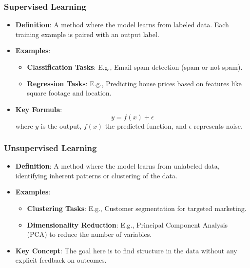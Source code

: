 \documentclass[aspectratio=169]{beamer}
\begin{document}
\begin{frame}[fragile]
    \frametitle{Supervised Learning}
    \begin{itemize}
        \item \textbf{Definition}: A method where the model learns from labeled data. Each training example is paired with an output label.
        \item \textbf{Examples}:
        \begin{itemize}
            \item \textbf{Classification Tasks}: E.g., Email spam detection (spam or not spam).
            \item \textbf{Regression Tasks}: E.g., Predicting house prices based on features like square footage and location.
        \end{itemize}
        \item \textbf{Key Formula}:
        \begin{equation}
            y = f(x) + \epsilon
        \end{equation}
        where \(y\) is the output, \(f(x)\) the predicted function, and \(\epsilon\) represents noise.
    \end{itemize}
\end{frame}

\begin{frame}[fragile]
    \frametitle{Unsupervised Learning}
    \begin{itemize}
        \item \textbf{Definition}: A method where the model learns from unlabeled data, identifying inherent patterns or clustering of the data.
        \item \textbf{Examples}:
        \begin{itemize}
            \item \textbf{Clustering Tasks}: E.g., Customer segmentation for targeted marketing.
            \item \textbf{Dimensionality Reduction}: E.g., Principal Component Analysis (PCA) to reduce the number of variables.
        \end{itemize}
        \item \textbf{Key Concept}: The goal here is to find structure in the data without any explicit feedback on outcomes.
    \end{itemize}
\end{frame}
\end{document}
